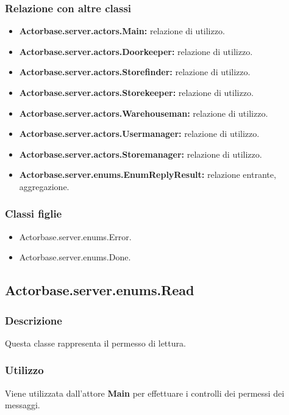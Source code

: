 \documentclass[a4paper]{article}
\begin{document}
			\subsubsection{Relazione con altre classi}
				\begin{itemize}
					\item \textbf{Actorbase.server.actors.Main:} relazione di utilizzo.
					\item \textbf{Actorbase.server.actors.Doorkeeper:} relazione di utilizzo.
					\item \textbf{Actorbase.server.actors.Storefinder:} relazione di utilizzo.
					\item \textbf{Actorbase.server.actors.Storekeeper:} relazione di utilizzo.
					\item \textbf{Actorbase.server.actors.Warehouseman:} relazione di utilizzo.
					\item \textbf{Actorbase.server.actors.Usermanager:} relazione di utilizzo.
					\item \textbf{Actorbase.server.actors.Storemanager:} relazione di utilizzo.
					\item \textbf{Actorbase.server.enums.EnumReplyResult:} relazione entrante, aggregazione.
				\end{itemize}
				
			\subsubsection{Classi figlie}
				\begin{itemize}
					\item Actorbase.server.enums.Error.
					\item Actorbase.server.enums.Done.
				\end{itemize}				
						
		\subsection{Actorbase.server.enums.Read}
			\subsubsection{Descrizione}
				Questa classe rappresenta il permesso di lettura.
				
			\subsubsection{Utilizzo}
				Viene utilizzata dall'attore \textbf{Main} per effettuare i controlli dei permessi dei messaggi. 
				
\end{document}
